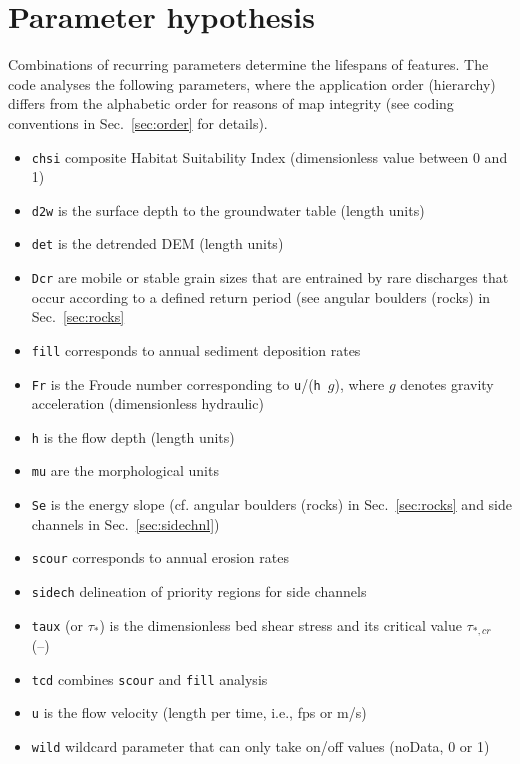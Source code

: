 \section{Parameter hypothesis} \label{sec:par}
Combinations of recurring parameters determine the lifespans of features. The code analyses the following parameters, where the application order (hierarchy) differs from the alphabetic order for reasons of map integrity (see coding conventions in Sec.~\ref{sec:order} for details).
\begin{itemize}
	\item \texttt{chsi} composite Habitat Suitability Index (dimensionless value between 0 and 1)
	\item \texttt{d2w} is the surface depth to the groundwater table (length units)
	\item \texttt{det} is the detrended DEM (length units)
	\item \texttt{Dcr} are mobile or stable grain sizes that are entrained by rare discharges that occur according to a defined return period (see angular boulders (rocks) in Sec.~\ref{sec:rocks}
	\item \texttt{fill} corresponds to annual sediment deposition rates \citep[length units; see also][]{wyrick16}
	\item \texttt{Fr} is the Froude number corresponding to \texttt{u}/(\texttt{h}~$g$), where $g$ denotes gravity acceleration (dimensionless hydraulic)
	\item \texttt{h} is the flow depth (length units)
	\item \texttt{mu} are the morphological units \citep[strings; see also][]{wyrick14b}
	\item \texttt{Se} is the energy slope (cf. angular boulders (rocks) in Sec.~\ref{sec:rocks} and side channels in Sec.~\ref{sec:sidechnl})
	\item \texttt{scour} corresponds to annual erosion rates \citep[length units, see also][]{wyrick16}
	\item \texttt{sidech} delineation of priority regions for side channels \citep{vandenderen17}
	\item \texttt{taux} (or $\tau_*$) is the dimensionless bed shear stress and its critical value $\tau_{*,cr}$ (--)
	\item \texttt{tcd} combines \texttt{scour} and \texttt{fill} analysis
	\item \texttt{u} is the flow velocity (length per time, i.e., fps or m/s)
	\item \texttt{wild} wildcard parameter that can only take on/off values (noData, 0 or 1)
\end{itemize}

